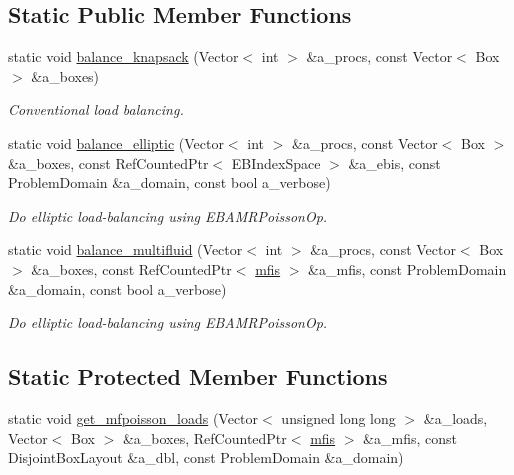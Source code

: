 \subsection*{Static Public Member Functions}
\begin{DoxyCompactItemize}
\item 
static void \hyperlink{classload__balance_a23d0bade2d5c9547e7b90370dc5d1296}{balance\+\_\+knapsack} (Vector$<$ int $>$ \&a\+\_\+procs, const Vector$<$ Box $>$ \&a\+\_\+boxes)
\begin{DoxyCompactList}\small\item\em Conventional load balancing. \end{DoxyCompactList}\item 
static void \hyperlink{classload__balance_a5bd63a9d59bc725ce3799c97ce628e11}{balance\+\_\+elliptic} (Vector$<$ int $>$ \&a\+\_\+procs, const Vector$<$ Box $>$ \&a\+\_\+boxes, const Ref\+Counted\+Ptr$<$ E\+B\+Index\+Space $>$ \&a\+\_\+ebis, const Problem\+Domain \&a\+\_\+domain, const bool a\+\_\+verbose)
\begin{DoxyCompactList}\small\item\em Do elliptic load-\/balancing using E\+B\+A\+M\+R\+Poisson\+Op. \end{DoxyCompactList}\item 
static void \hyperlink{classload__balance_afb59e1222bd229a88145d9cb9164126f}{balance\+\_\+multifluid} (Vector$<$ int $>$ \&a\+\_\+procs, const Vector$<$ Box $>$ \&a\+\_\+boxes, const Ref\+Counted\+Ptr$<$ \hyperlink{classmfis}{mfis} $>$ \&a\+\_\+mfis, const Problem\+Domain \&a\+\_\+domain, const bool a\+\_\+verbose)
\begin{DoxyCompactList}\small\item\em Do elliptic load-\/balancing using E\+B\+A\+M\+R\+Poisson\+Op. \end{DoxyCompactList}\end{DoxyCompactItemize}
\subsection*{Static Protected Member Functions}
\begin{DoxyCompactItemize}
\item 
static void \hyperlink{classload__balance_ac7b19cb6aa7511dd565baab5764ad9c5}{get\+\_\+mfpoisson\+\_\+loads} (Vector$<$ unsigned long long $>$ \&a\+\_\+loads, Vector$<$ Box $>$ \&a\+\_\+boxes, Ref\+Counted\+Ptr$<$ \hyperlink{classmfis}{mfis} $>$ \&a\+\_\+mfis, const Disjoint\+Box\+Layout \&a\+\_\+dbl, const Problem\+Domain \&a\+\_\+domain)
\end{DoxyCompactItemize}



